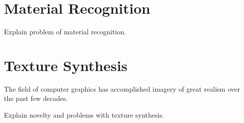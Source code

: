 \hypertarget{MaterialRecognition}{
\section{Material Recognition}
\label{MaterialRecognition}%
}
Explain problem of material recognition.

\hypertarget{TextureSynthesis}{
\section{Texture Synthesis}
\label{ReflectionModels}%
}
The field of computer graphics has accomplished imagery of great realism over the past few decades. 

Explain novelty and problems with texture synthesis.


